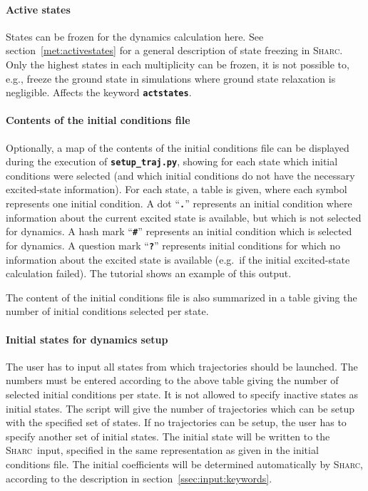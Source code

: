 \documentclass[a4paper,11pt,DIV=15,openany,twoside=false]{scrbook}
\newcommand{\sharc}{\textsc{Sharc}}
\newcommand{\ttt}[1]{\textbf{\texttt{#1}}}
\begin{document}
\paragraph{Active states}

States can be frozen for the dynamics calculation here. See section~\ref{met:activestates} for a general description of state freezing in \sharc. Only the highest states in each multiplicity can be frozen, it is not possible to, e.g., freeze the ground state in simulations where ground state relaxation is negligible. Affects the keyword \ttt{actstates}.

\paragraph{Contents of the initial conditions file}

Optionally, a map of the contents of the initial conditions file can be displayed during the execution of \ttt{setup\_traj.py}, showing for each state which initial conditions were selected (and which initial conditions do not have the necessary excited-state information). For each state, a table is given, where each symbol represents one initial condition. A dot ``\ttt{.}'' represents an initial condition where information about the current excited state is available, but which is not selected for dynamics. A hash mark ``\ttt{\#}'' represents an initial condition which is selected for dynamics. A question mark ``\ttt{?}'' represents initial conditions for which no information about the excited state is available (e.g.\ if the initial excited-state calculation failed). The tutorial shows an example of this output.

The content of the initial conditions file is also summarized in a table giving the number of initial conditions selected per state. 

\paragraph{Initial states for dynamics setup}

The user has to input all states from which trajectories should be launched. The numbers must be entered according to the above table giving the number of selected initial conditions per state. It is not allowed to specify inactive states as initial states. The script will give the number of trajectories which can be setup with the specified set of states. If no trajectories can be setup, the user has to specify another set of initial states. The initial state will be written to the \sharc\ input, specified in the same representation as given in the initial conditions file. The initial coefficients will be determined automatically by \sharc, according to the description in section~\ref{ssec:input:keywords}.
\end{document}
